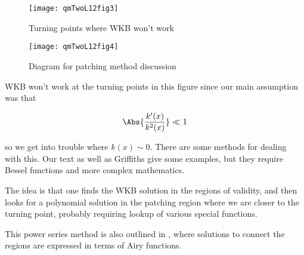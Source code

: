 \begin{figure}[htp]
   \centering
   \texttt{[image: qmTwoL12fig3]}
   \caption{Turning points where WKB won't work}\label{fig:qmTwoL13:qmTwoL12fig3}
\end{figure}

\begin{figure}[htp]
   \centering
   \texttt{[image: qmTwoL12fig4]}
   \caption{Diagram for patching method discussion}\label{fig:qmTwoL13:qmTwoL12fig4}
\end{figure}

WKB won't work at the turning points in this figure since our main assumption was that

\begin{equation}\label{eqn:qmTwoL12:390}
\Abs{\frac{k'(x)}{k^2(x)}} \ll 1
\end{equation}

so we get into trouble where $k(x) \sim 0$.  There are some methods for dealing with this.  Our text as well as Griffiths give some examples, but they require Bessel functions and more complex mathematics.

The idea is that one finds the WKB solution in the regions of validity, and then looks for a polynomial solution in the patching region where we are closer to the turning point, probably requiring lookup of various special functions.

This power series method is also outlined in \cite{wiki:wkb}, where solutions to connect the regions are expressed in terms of Airy functions.

\EndArticle
